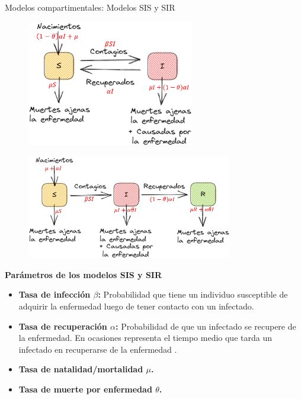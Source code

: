 \documentclass[9pt]{beamer}
\begin{document}
\begin{frame}{Modelos compartimentales: Modelos SIS y SIR}
\begin{minipage}{0.55\textwidth}
\begin{figure}[h]
  \centering
    \includegraphics[width=0.65\textwidth]{Imagenes/SIS_compartimientos.PNG}
\end{figure}
\begin{figure}[h]
  \centering
    \includegraphics[width=0.8\textwidth]{Imagenes/SIR_compartimientos.PNG}
\end{figure}
\end{minipage}
\hfill
\begin{minipage}{0.415\textwidth}
\begin{block}{\textbf{Parámetros de los modelos SIS y SIR}}
\begin{itemize}
    \item \textbf{Tasa de infección $\beta$:} Probabilidad que tiene un individuo susceptible de adquirir la enfermedad luego de tener contacto con un infectado.
    \item \textbf{Tasa de recuperación $\alpha$:} Probabilidad de que un infectado se recupere de la enfermedad. En ocasiones representa el tiempo medio que tarda un infectado en recuperarse de la enfermedad \cite{diego2010}.
    \item \textbf{Tasa de natalidad/mortalidad $\mu$.}
    \item \textbf{Tasa de muerte por enfermedad $\theta$.}
\end{itemize}
\end{block}
\end{minipage}
\end{frame}
\end{document}

